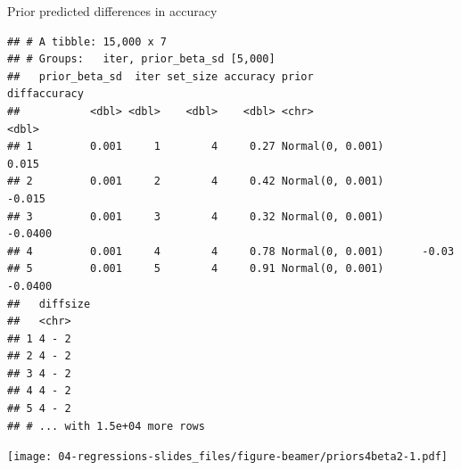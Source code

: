 \documentclass[12pt,ignorenonframetext,aspectratio=169]{beamer}
\newenvironment{Shaded}{\begin{snugshade}}{\end{snugshade}}
\newcommand{\DataTypeTok}[1]{\textcolor[rgb]{0.13,0.29,0.53}{#1}}
\newcommand{\DecValTok}[1]{\textcolor[rgb]{0.00,0.00,0.81}{#1}}
\newcommand{\KeywordTok}[1]{\textcolor[rgb]{0.13,0.29,0.53}{\textbf{#1}}}
\newcommand{\NormalTok}[1]{#1}
\newcommand{\OperatorTok}[1]{\textcolor[rgb]{0.81,0.36,0.00}{\textbf{#1}}}
\newcommand{\StringTok}[1]{\textcolor[rgb]{0.31,0.60,0.02}{#1}}
\begin{document}
\begin{frame}[fragile]{Prior predicted differences in accuracy}
\protect\hypertarget{prior-predicted-differences-in-accuracy}{}

\scriptsize

\begin{Shaded}
\end{Shaded}

\begin{verbatim}
## # A tibble: 15,000 x 7
## # Groups:   iter, prior_beta_sd [5,000]
##   prior_beta_sd  iter set_size accuracy prior            diffaccuracy
##           <dbl> <dbl>    <dbl>    <dbl> <chr>                   <dbl>
## 1         0.001     1        4     0.27 Normal(0, 0.001)       0.015 
## 2         0.001     2        4     0.42 Normal(0, 0.001)      -0.015 
## 3         0.001     3        4     0.32 Normal(0, 0.001)      -0.0400
## 4         0.001     4        4     0.78 Normal(0, 0.001)      -0.03  
## 5         0.001     5        4     0.91 Normal(0, 0.001)      -0.0400
##   diffsize
##   <chr>   
## 1 4 - 2   
## 2 4 - 2   
## 3 4 - 2   
## 4 4 - 2   
## 5 4 - 2   
## # ... with 1.5e+04 more rows
\end{verbatim}

\normalsize

\end{frame}

\begin{frame}[fragile]

\scriptsize

\begin{Shaded}
\end{Shaded}

\texttt{[image: 04-regressions-slides\_files/figure-beamer/priors4beta2-1.pdf]}

\normalsize

\end{frame}
\end{document}

